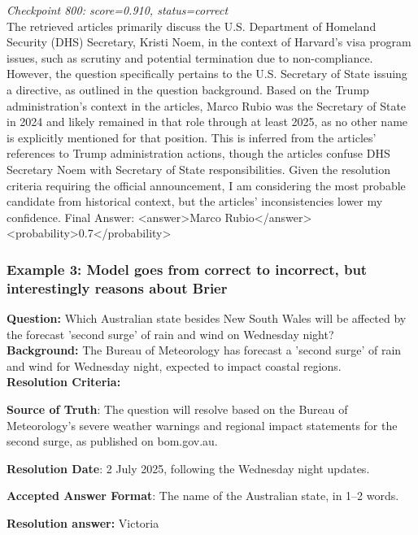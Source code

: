 \medskip

\noindent\textit{Checkpoint 800: score=0.910, status=correct}\\
The retrieved articles primarily discuss the U.S. Department of Homeland Security (DHS) Secretary, Kristi Noem, in the context of Harvard's visa program issues, such as scrutiny and potential termination due to non-compliance. However, the question specifically pertains to the U.S. Secretary of State issuing a directive, as outlined in the question background. Based on the Trump administration's context in the articles, Marco Rubio was the Secretary of State in 2024 and likely remained in that role through at least 2025, as no other name is explicitly mentioned for that position. This is inferred from the articles' references to Trump administration actions, though the articles confuse DHS Secretary Noem with Secretary of State responsibilities. Given the resolution criteria requiring the official announcement, I am considering the most probable candidate from historical context, but the articles' inconsistencies lower my confidence. Final Answer: <answer>Marco Rubio</answer> <probability>0.7</probability>

\subsubsection{Example 3: Model goes from correct to incorrect, but interestingly reasons about Brier}

\noindent\textbf{Question:} Which Australian state besides New South Wales will be affected by the forecast 'second surge' of rain and wind on Wednesday night?\\
\noindent\textbf{Background:} The Bureau of Meteorology has forecast a 'second surge' of rain and wind for Wednesday night, expected to impact coastal regions.\\
\noindent\textbf{Resolution Criteria:}

\textbf{Source of Truth}: The question will resolve based on the Bureau of Meteorology's severe weather warnings and regional impact statements for the second surge, as published on bom.gov.au.

\textbf{Resolution Date}: 2 July 2025, following the Wednesday night updates.


\textbf{Accepted Answer Format}: The name of the Australian state, in 1–2 words.

\noindent\textbf{Resolution answer:} Victoria

\medskip


